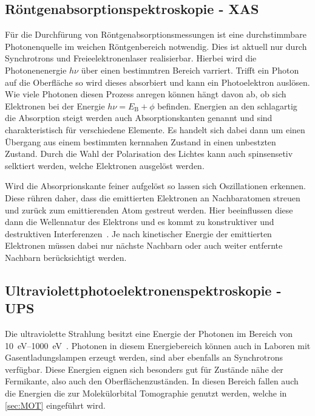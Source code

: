         \subsection{Röntgenabsorptionspektroskopie - XAS}
            Für die Durchfürung von Röntgenabsorptionsmessungen ist eine durchstimmbare Photonenquelle im weichen Röntgenbereich notwendig.
            Dies ist aktuell nur durch Synchrotrons und Freieelektronenlaser realisierbar.
            Hierbei wird die Photonenenergie $h\nu$ über einen bestimmtren Bereich varriert. %
            Trifft ein Photon auf die Oberfläche so wird dieses absorbiert und kann ein Photoelektron auslösen.
            Wie viele Photonen diesen Prozess anregen können hängt davon ab, ob sich Elektronen bei der Energie $h\nu = E_\text{B}+\phi$ befinden.
            Energien an den schlagartig die Absorption steigt werden auch Absorptionskanten genannt und sind charakteristisch für verschiedene Elemente. 
            Es handelt sich dabei dann um einen Übergang aus einem bestimmten kernnahen Zustand in einen unbestzten Zustand.
            Durch die Wahl der Polarisation des Lichtes kann auch spinsensetiv selktiert werden, welche Elektronen ausgelöst werden.

            Wird die Absorprionskante feiner aufgelöst so lassen sich Oszillationen erkennen.
            Diese rühren daher, dass die emittierten Elektronen an Nachbaratomen streuen und zurück zum emittierenden Atom gestreut werden.
            Hier beeinflussen diese dann die Wellennatur des Elektrons und es kommt zu konstruktiver und destruktiven Interferenzen~\cite{Fauster}.
            Je nach kinetischer Energie der emittierten Elektronen müssen dabei nur nächste Nachbarn oder auch weiter entfernte Nachbarn berücksichtigt werden.

        \subsection{Ultraviolettphotoelektronenspektroskopie - UPS} \label{sec:UPS}
            Die ultraviolette Strahlung besitzt eine Energie der Photonen im Bereich von \SIrange{10}{1000}{\electronvolt}~\cite{Fauster}.
            Photonen in diesem Energiebereich können auch in Laboren mit Gasentladungslampen erzeugt werden, sind aber ebenfalls an Synchrotrons verfügbar.
            Diese Energien eignen sich besonders gut für Zustände nähe der Fermikante, also auch den Oberflächenzuständen.
            In diesen Bereich fallen auch die Energien die zur Molekülorbital Tomographie genutzt werden, welche in \autoref{sec:MOT} eingeführt wird.

